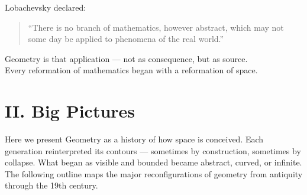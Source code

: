 \documentclass[9pt]{article}
\begin{document}
\vspace{1em}

\noindent
Lobachevsky declared: \\

\begin{quote}
“There is no branch of mathematics, however abstract, which may not some day be applied to phenomena of the real world.”
\end{quote}

\noindent
Geometry is that application — not as consequence, but as source. \\

\noindent
Every reformation of mathematics began with a reformation of space.

\newpage

\section*{II. Big Pictures}

\noindent
Here we present Geometry as a history of how space is conceived.
Each generation reinterpreted its contours — sometimes by construction, sometimes by collapse. What began as visible and bounded became abstract, curved, or infinite. The following outline maps the major reconfigurations of geometry from antiquity through the 19th century.

\vspace{1em}
\end{document}
